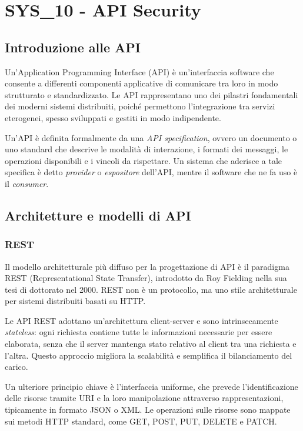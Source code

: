 \newpage
\section{SYS\_10 - API Security}

\subsection{Introduzione alle API}

Un'Application Programming Interface (API) è un'interfaccia software che consente a differenti componenti applicative di comunicare tra loro in modo strutturato e standardizzato. Le API rappresentano uno dei pilastri fondamentali dei moderni sistemi distribuiti, poiché permettono l'integrazione tra servizi eterogenei, spesso sviluppati e gestiti in modo indipendente.

Un'API è definita formalmente da una \emph{API specification}, ovvero un documento o uno standard che descrive le modalità di interazione, i formati dei messaggi, le operazioni disponibili e i vincoli da rispettare. Un sistema che aderisce a tale specifica è detto \emph{provider} o \emph{espositore} dell'API, mentre il software che ne fa uso è il \emph{consumer}.

\subsection{Architetture e modelli di API}

\subsubsection{REST}

Il modello architetturale più diffuso per la progettazione di API è il paradigma REST (Representational State Transfer), introdotto da Roy Fielding nella sua tesi di dottorato nel 2000. REST non è un protocollo, ma uno stile architetturale per sistemi distribuiti basati su HTTP.

Le API REST adottano un'architettura client-server e sono intrinsecamente \emph{stateless}: ogni richiesta contiene tutte le informazioni necessarie per essere elaborata, senza che il server mantenga stato relativo al client tra una richiesta e l'altra. Questo approccio migliora la scalabilità e semplifica il bilanciamento del carico.

Un ulteriore principio chiave è l'interfaccia uniforme, che prevede l'identificazione delle risorse tramite URI e la loro manipolazione attraverso rappresentazioni, tipicamente in formato JSON o XML. Le operazioni sulle risorse sono mappate sui metodi HTTP standard, come GET, POST, PUT, DELETE e PATCH.

